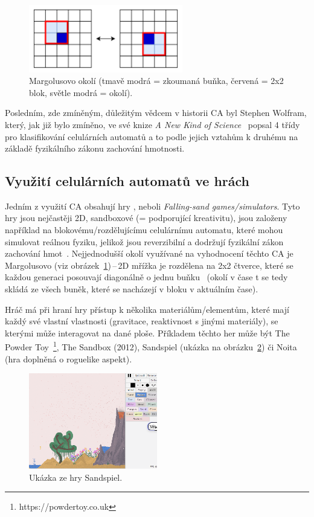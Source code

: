 \begin{figure}[H]
    \centering
    \includegraphics[width=0.6\textwidth]{obrazky-figures/ch2/Margolus.png}
    \caption{Margolusovo okolí (tmavě modrá = zkoumaná buňka, červená = 2x2 blok, světle modrá = okolí).}
    \label{fig:Margolus}
\end{figure}

Posledním, zde zmíněným, důležitým vědcem v historii CA byl Stephen Wolfram, který, jak již bylo zmíněno, ve své knize \textit{A New Kind of Science}~\cite{wolfram-NewKindOfScience} popsal 4 třídy pro klasifikování celulárních automatů a to podle jejich vztahům k druhému na základě fyzikálního zákonu zachování hmotnosti.

\subsection*{Využití celulárních automatů ve hrách}
Jedním z využití CA obsahují hry , neboli \textit{Falling-sand games/simulators}. Tyto hry jsou nejčastěji 2D, sandboxové (= podporující kreativitu), jsou založeny například na blokovému/rozdělujícímu celulárnímu automatu, které mohou simulovat reálnou fyziku, jelikož jsou reverzibilní a dodržují fyzikální zákon zachování hmot~\cite{schiff2011cellular}. Nejjednodušší okolí využívané na vyhodnocení těchto CA je Margolusovo (viz obrázek~\ref{fig:Margolus})\,--\,2D mřížka je rozdělena na 2x2 čtverce, které se každou generaci posouvají diagonálně o jednu buňku~\cite{schiff2011cellular} (okolí v čase t se tedy skládá ze všech buněk, které se nacházejí v bloku v aktuálním čase).

\noindent Hráč má při hraní hry přístup k několika materiálům/elementům, které mají každý své vlastní vlastnosti (gravitace, reaktivnost s jinými materiály), se kterými může interagovat na dané ploše. Příkladem těchto her může být The Powder Toy~\footnote{https://powdertoy.co.uk}, The Sandbox (2012), Sandspiel (ukázka na obrázku~\ref{fig:Sandspiel}) či Noita (hra doplněná o roguelike aspekt).
\begin{figure}[H]
    \centering
    \includegraphics[width=0.5\textwidth]{obrazky-figures/ch2/SandSpiel.png}
    \caption{Ukázka ze hry Sandspiel.}
    \label{fig:Sandspiel}
\end{figure}

